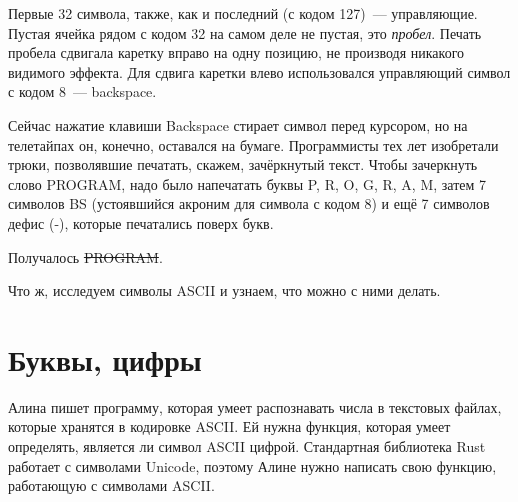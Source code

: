 
Первые 32 символа, также, как и последний (с кодом 127)~--- управляющие.
Пустая ячейка рядом с кодом 32 на самом деле не пустая, это {\em пробел}.
Печать пробела сдвигала каретку вправо на одну позицию, не производя никакого видимого эффекта.
Для сдвига каретки влево использовался управляющий символ с кодом 8~--- backspace.

Сейчас нажатие клавиши Backspace стирает символ перед курсором, но на телетайпах он, конечно, оставался на бумаге.
Программисты тех лет изобретали трюки, позволявшие печатать, скажем, зачёркнутый текст.
Чтобы зачеркнуть слово PROGRAM, надо было напечатать буквы P, R, O, G, R, A, M, затем 7 символов BS (устоявшийся акроним для символа с кодом 8) и ещё 7 символов дефис (-), которые печатались поверх букв.

Получалось \sout{PROGRAM}.

Что ж, исследуем символы ASCII и узнаем, что можно с ними делать.

\section{Буквы, цифры}

\begin{Exercise}
  \Question
  Алина пишет программу, которая умеет распознавать числа в текстовых файлах, которые хранятся в кодировке ASCII.
  Ей нужна функция, которая умеет определять, является ли символ ASCII цифрой.
  Стандартная библиотека Rust работает с символами Unicode, поэтому Алине нужно написать свою функцию, работающую с символами ASCII.
\end{Exercise}

